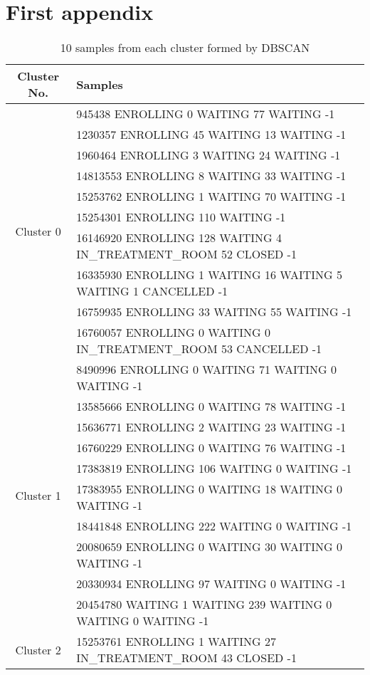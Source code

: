 \chapter{First appendix}
\label{chapter:first-appendix}

{\scriptsize
\begin{longtable}{|c|p{}|}
\caption{10 samples from each cluster formed by DBSCAN}
\label{tab:samplesFromCluster}\\
		\hline
		Cluster No. & Samples \\
		\hline
		\multirow{10}{*}{Cluster 0}
		& 945438 ENROLLING 0 WAITING 77 WAITING -1 \\
		& 1230357 ENROLLING 45 WAITING 13 WAITING -1 \\
		& 1960464 ENROLLING 3 WAITING 24 WAITING -1 \\
		& 14813553 ENROLLING 8 WAITING 33 WAITING -1 \\
		& 15253762 ENROLLING 1 WAITING 70 WAITING -1 \\
		& 15254301 ENROLLING 110 WAITING -1 \\
		& 16146920 ENROLLING 128 WAITING 4 IN\_TREATMENT\_ROOM 52 CLOSED -1 \\
		& 16335930 ENROLLING 1 WAITING 16 WAITING 5 WAITING 1 CANCELLED -1 \\
		& 16759935 ENROLLING 33 WAITING 55 WAITING -1 \\
		& 16760057 ENROLLING 0 WAITING 0 IN\_TREATMENT\_ROOM 53 CANCELLED -1 \\
		\hline
		\multirow{10}{*}{Cluster 1}
		& 8490996 ENROLLING 0 WAITING 71 WAITING 0 WAITING -1 \\
		& 13585666 ENROLLING 0 WAITING 78 WAITING -1 \\
		& 15636771 ENROLLING 2 WAITING 23 WAITING -1 \\
		& 16760229 ENROLLING 0 WAITING 76 WAITING -1 \\
		& 17383819 ENROLLING 106 WAITING 0 WAITING -1 \\
		& 17383955 ENROLLING 0 WAITING 18 WAITING 0 WAITING -1 \\
		& 18441848 ENROLLING 222 WAITING 0 WAITING -1 \\
		& 20080659 ENROLLING 0 WAITING 30 WAITING 0 WAITING -1 \\
		& 20330934 ENROLLING 97 WAITING 0 WAITING -1 \\
		& 20454780 WAITING 1 WAITING 239 WAITING 0 WAITING 0 WAITING -1 \\
		\hline
		\multirow{10}{*}{Cluster 2}
		& 15253761 ENROLLING 1 WAITING 27 IN\_TREATMENT\_ROOM 43 CLOSED -1 \\

\end{longtable}}
